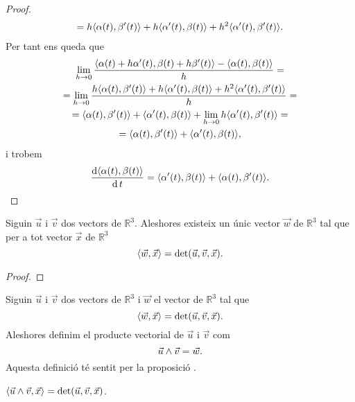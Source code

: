 \documentclass[../../Main.tex]{subfiles}
\begin{document}
\begin{proposition}
\begin{proof}
\begin{multline*}
				=h\prodesc{\alpha(t)}{\beta'(t)}+h\prodesc{\alpha'(t)}{\beta(t)}+h^{2}\prodesc{\alpha'(t)}{\beta'(t)}.
			\end{multline*}
			Per tant ens queda que
			\begin{multline*}
				\lim_{h\to0}\frac{\prodesc{\alpha(t)+h\alpha'(t)}{\beta(t)+h\beta'(t)}-\prodesc{\alpha(t)}{\beta(t)}}{h}=\\
				=\lim_{h\to0}\frac{h\prodesc{\alpha(t)}{\beta'(t)}+h\prodesc{\alpha'(t)}{\beta(t)}+h^{2}\prodesc{\alpha'(t)}{\beta'(t)}}{h}=\\
				=\prodesc{\alpha(t)}{\beta'(t)}+\prodesc{\alpha'(t)}{\beta(t)}+\lim_{h\to0}h\prodesc{\alpha'(t)}{\beta'(t)}=\\
				=\prodesc{\alpha(t)}{\beta'(t)}+\prodesc{\alpha'(t)}{\beta(t)},
			\end{multline*}
			i trobem
			\[\frac{\diff\prodesc{\alpha(t)}{\beta(t)}}{\diff t}=\prodesc{\alpha'(t)}{\beta(t)}+\prodesc{\alpha(t)}{\beta'(t)}.\qedhere\]
		\end{proof}
	\end{proposition}
	\begin{proposition}
		\label{prop:unicitat del producte vectorial entre dos vectors}
		Siguin \(\vec{u}\) i \(\vec{v}\) dos vectors de \(\mathbb{R}^{3}\). Aleshores existeix un únic vector \(\vec{w}\) de \(\mathbb{R}^{3}\) tal que per a tot vector \(\vec{x}\) de \(\mathbb{R}^{3}\)
		\[\prodesc{\vec{w}}{\vec{x}}=\det(\vec{u},\vec{v},\vec{x}).\]
		\begin{proof}
		\end{proof}
	\end{proposition}
	\begin{definition}
		\label{def:producte vectorial}
		Siguin \(\vec{u}\) i \(\vec{v}\) dos vectors de \(\mathbb{R}^{3}\) i \(\vec{w}\) el vector de \(\mathbb{R}^{3}\) tal que
		\[\prodesc{\vec{w}}{\vec{x}}=\det(\vec{u},\vec{v},\vec{x}).\]
		Aleshores definim el producte vectorial de \(\vec{u}\) i \(\vec{v}\) com
		\[\vec{u}\mathbin{\wedge}\vec{v}=\vec{w}.\]
		Aquesta definició té sentit per la proposició .
	\end{definition}
	\begin{observation}
		\label{obs:fórmula del determinant segons el producte vectorial i el producte escalar}
		\(\prodesc{\vec{u}\prodvec\vec{v}}{\vec{x}}=\det(\vec{u},\vec{v},\vec{x})\).
	\end{observation}
\end{document}
